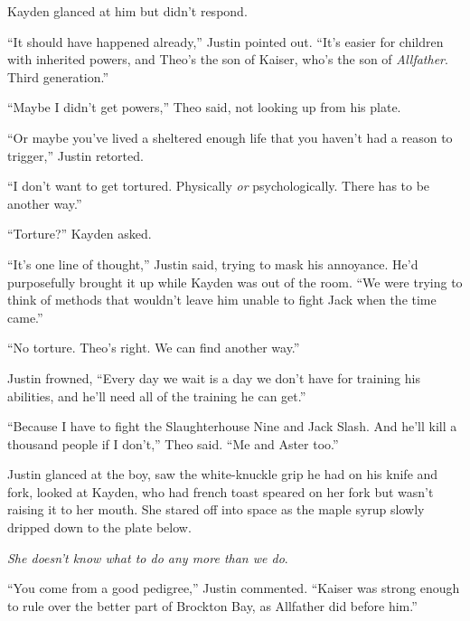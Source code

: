 Kayden glanced at him but didn't respond.



``It should have happened already,'' Justin pointed out.  ``It's easier for children with inherited powers, and Theo's the son of Kaiser, who's the son of \emph{Allfather}.  Third generation.''



``Maybe I didn't get powers,'' Theo said, not looking up from his plate.



``Or maybe you've lived a sheltered enough life that you haven't had a reason to trigger,'' Justin retorted.



``I don't want to get tortured.  Physically \emph{or} psychologically.  There has to be another way.''



``Torture?'' Kayden asked.



``It's one line of thought,'' Justin said, trying to mask his annoyance.  He'd purposefully brought it up while Kayden was out of the room.  ``We were trying to think of methods that wouldn't leave him unable to fight Jack when the time came.''



``No torture.  Theo's right.  We can find another way.''



Justin frowned, ``Every day we wait is a day we don't have for training his abilities, and he'll need all of the training he can get.''



``Because I have to fight the Slaughterhouse Nine and Jack Slash.  And he'll kill a thousand people if I don't,'' Theo said.  ``Me and Aster too.''



Justin glanced at the boy, saw the white-knuckle grip he had on his knife and fork, looked at Kayden, who had french toast speared on her fork but wasn't raising it to her mouth.  She stared off into space as the maple syrup slowly dripped down to the plate below.



\emph{She doesn't know what to do any more than we do}.



``You come from a good pedigree,'' Justin commented.  ``Kaiser was strong enough to rule over the better part of Brockton Bay, as Allfather did before him.''



